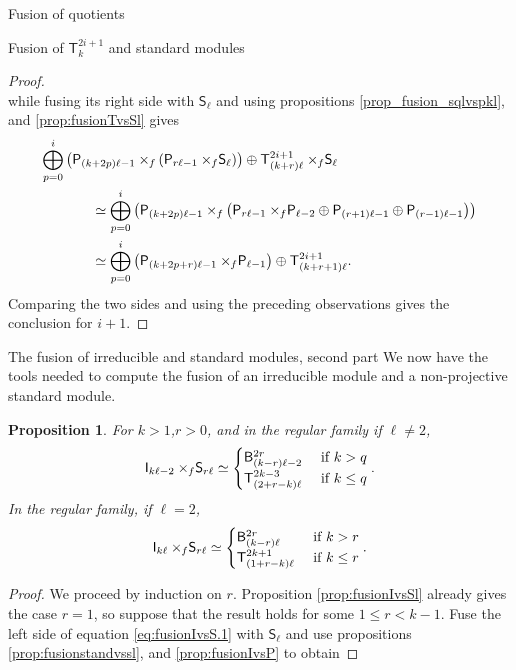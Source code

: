 \documentclass[reqno]{amsart}
\newtheorem{Prop}[Thm]{Proposition}
\newcommand{\ds}[1]{\mathsf S_{#1}}
\newcommand{\dl}[1]{\mathsf I_{#1}}
\newcommand{\dP}[1]{\mathsf P_{#1}}
\newcommand{\xf}{\times\hspace{-0.27em}_f}
\newcommand{\T}[2]{\mathsf{T}^{#1}_{#2}}
\newcommand{\B}[2]{\mathsf{B}^{#1}_{#2}}
\newcommand{\lc}{\ell}
\begin{document}
\begin{section}{Fusion of quotients}
\begin{subsection}{Fusion of $\T{2i+1}{k}$ and standard modules}
\begin{proof}
\begin{equation}
\end{equation}
while fusing its right side with $\ds{\lc}$ and using propositions \ref{prop_fusion_sqlvspkl}, and \ref{prop:fusionTvsSl} gives
\begin{align}
\overset{i}{\underset{p=0}{\bigoplus}}& \left( \dP{(k+2p)\lc-1}  \xf \left(\dP{r\lc-1}\xf \ds{\lc}\right)\right) \oplus \T{2i+1}{(k+r)\lc}\xf \ds{\lc} \notag \\
 & \qquad \simeq \overset{i}{\underset{p=0}{\bigoplus}}\left( \dP{(k+2p)\lc-1} \xf \left(\dP{r\lc-1} \xf \dP{\lc-2} \oplus \dP{(r+1)\lc -1} \oplus \dP{(r-1)\lc -1}\right)\right)\notag\\
	& \qquad \simeq \overset{i}{\underset{p=0}{\bigoplus}}\left(\dP{(k+2p+r)\lc -1}\xf \dP{\lc-1}\right) \oplus \T{2i+1}{(k+r+1)\lc}.
\end{align} 
Comparing the two sides and using the preceding observations gives the conclusion for $i+1$.
\end{proof}
\end{subsection}
\begin{subsection}{The fusion of irreducible and standard modules, second part}
We now have the tools needed to compute the fusion of an irreducible module and a non-projective standard module.
\begin{Prop}\label{prop:fusionIlvsSql}
For $k>1$,$r>0$, and in the regular family if $\lc \neq 2$,
\begin{equation}\label{eq:fusionIvsS.1}
\dl{k \lc-2} \xf \ds{r\lc} \simeq \begin{cases}
\B{2r}{(k-r)\lc -2} & \text{ if } k>q\\
\T{2k-3}{(2+r-k)\lc} & \text{ if } k\leq q
\end{cases}.
\end{equation}
In the regular family, if $\lc = 2$,
\begin{equation}
\dl{k \lc} \xf \ds{r\lc} \simeq \begin{cases}
\B{2r}{(k-r)\lc} & \text{ if } k>r\\
\T{2k+1}{(1+r-k)\lc} & \text{ if } k\leq r
\end{cases}.
\end{equation}
\end{Prop}
\begin{proof}
We proceed by induction on $r$. Proposition \ref{prop:fusionIvsSl} already gives the case $r=1$, so suppose that the result holds for some $1 \leq r<k-1$. Fuse the left side of equation \eqref{eq:fusionIvsS.1} with $\ds{\lc}$ and use propositions \ref{prop:fusionstandvssl}, and \ref{prop:fusionIvsP} to obtain

\end{proof}
\end{subsection}
\end{section}
\end{document}
